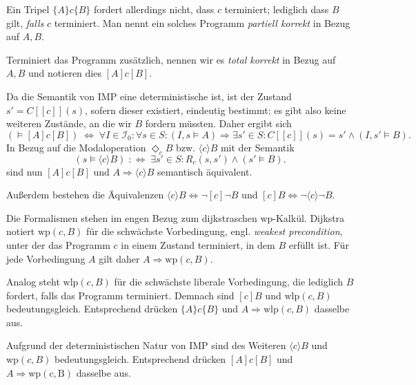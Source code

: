 \documentclass[8pt,fleqn,aspectratio=169]{beamer}
\newcommand{\parspace}{\vspace{0.8em}}
\newcommand{\qb}[1]{[\!\![#1]\!\!]}
\begin{document}
\begin{frame}
Ein Tripel $\{A\}c\{B\}$ fordert allerdings nicht, dass $c$ terminiert;
lediglich dass $B$ gilt, \emph{falls} $c$ terminiert. Man nennt ein
solches Programm \emph{partiell korrekt} in Bezug auf $A,B$.\pause

\parspace
Terminiert das Programm zusätzlich, nennen wir es \emph{total korrekt}
in Bezug auf $A,B$ und notieren dies $[A]c[B]$.\pause

\parspace
Da die Semantik von IMP eine deterministische ist, ist der Zustand $s'=C\qb{c}(s)$,
sofern dieser existiert, eindeutig bestimmt; es gibt also keine weiteren Zustände,
an die wir $B$ fordern müssten. Daher ergibt sich
\[(\models [A]c [B]) \;\Leftrightarrow\; \forall I\in\mathcal I_0\colon\forall s\in S\colon
(I,s\models A)\Rightarrow\exists s'\in S\colon C\qb{c}(s)=s'\land (I,s'\models B).\]\pause
In Bezug auf die Modaloperation $\Diamond_c B$ bzw. $\langle c\rangle B$ mit der Semantik
\[(s\models\langle c\rangle B)\;:\Leftrightarrow\; \exists s'\in S\colon R_c(s,s')\land (s'\models B).\]
sind nun $[A]c[B]$ und $A\Rightarrow\langle c\rangle B$ semantisch äquivalent.

\parspace
{\footnotesize Außerdem bestehen die Äquivalenzen
$\langle c\rangle B \Leftrightarrow \lnot [c]\lnot B$
und $[c]B\Leftrightarrow\lnot\langle c\rangle\lnot B$.}
\end{frame}

\begin{frame}
Die Formalismen stehen im engen Bezug zum dijkstraschen wp-Kalkül.
Dijkstra notiert $\mathrm{wp}(c,B)$ für die schwächste Vorbedingung,
engl. \emph{weakest precondition}, unter der das Programm $c$ in einem
Zustand terminiert, in dem $B$ erfüllt ist. Für jede Vorbedingung $A$
gilt daher $A\Rightarrow\mathrm{wp}(c,B)$.\pause

\parspace
Analog steht $\mathrm{wlp}(c,B)$ für die schwächste liberale
Vorbedingung, die lediglich $B$ fordert, falls das Programm terminiert.
Demnach sind $[c]B$ und $\mathrm{wlp}(c,B)$ bedeutungsgleich.
Entsprechend drücken $\{A\}c\{B\}$ und $A\Rightarrow\mathrm{wlp}(c,B)$
dasselbe aus.\pause

\parspace
Aufgrund der deterministischen Natur von IMP sind des Weiteren
$\langle c\rangle B$ und $\mathrm{wp}(c,B)$ bedeutungsgleich.
Entsprechend drücken $[A]c[B]$ und $A\Rightarrow\mathrm{wp(c,B)}$
dasselbe aus.
\end{frame}
\end{document}
